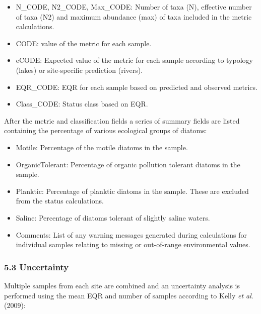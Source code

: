 \documentclass[]{article}
\begin{document}
\begin{itemize}
\item
  N\_CODE, N2\_CODE, Max\_CODE: Number of taxa (N), effective number of
  taxa (N2) and maximum abundance (max) of taxa included in the metric
  calculations.
\item
  CODE: value of the metric for each sample.
\item
  eCODE: Expected value of the metric for each sample according to
  typology (lakes) or site-specific prediction (rivers).
\item
  EQR\_CODE: EQR for each sample based on predicted and observed
  metrics.
\item
  Class\_CODE: Status class based on EQR.
\end{itemize}

After the metric and classification fields a series of summary fields
are listed containing the percentage of various ecological groups of
diatoms:

\begin{itemize}
\item
  Motile: Percentage of the motile diatoms in the sample.
\item
  OrganicTolerant: Percentage of organic pollution tolerant diatoms in
  the sample.
\item
  Planktic: Percentage of planktic diatoms in the sample. These are
  excluded from the status calculations.
\item
  Saline: Percentage of diatoms tolerant of slightly saline waters.
\item
  Comments: List of any warning messages generated during calculations
  for individual samples relating to missing or out-of-range
  environmental values.
\end{itemize}

\subsubsection{5.3 Uncertainty}\label{uncertainty}

Multiple samples from each site are combined and an uncertainty analysis
is performed using the mean EQR and number of samples according to Kelly
\emph{et al}. (2009):
\end{document}
